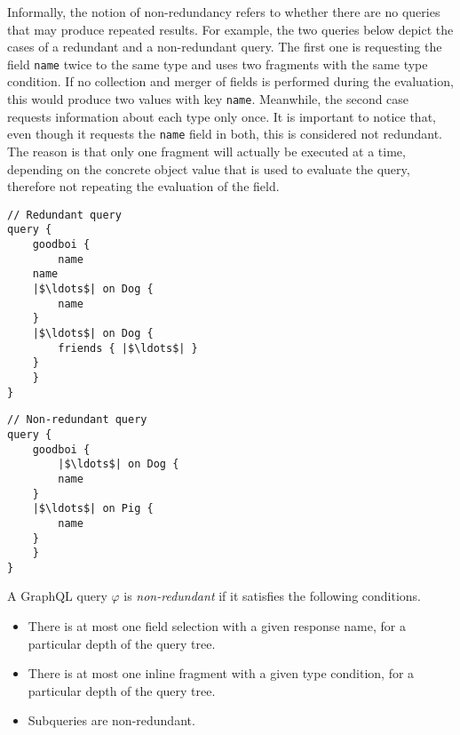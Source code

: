 Informally, the notion of non-redundancy refers to whether there are no queries that may produce repeated results. For example, the two queries below depict the cases of a redundant and a non-redundant query. The first one is requesting the field \texttt{name} twice to the same type and uses two fragments with the same type condition. If no collection and merger of fields is performed during the evaluation, this would produce two values with key \texttt{name}. Meanwhile, the second case requests information about each type only once. It is important to notice that, even though it requests the \texttt{name} field in both,  this is considered not redundant. The reason is that only one fragment will actually be executed at a time, depending on the concrete object value that is used to evaluate the query, therefore not repeating the evaluation of the field.
\begin{minipage}[t]{.25\textwidth}
\begin{verbatim}
// Redundant query
query {
    goodboi {
        name
	name
	|$\ldots$| on Dog {
	    name
	}
	|$\ldots$| on Dog {
	    friends { |$\ldots$| }
	}
    }
}
\end{verbatim}
\end{minipage}%
\begin{minipage}[t]{.25\textwidth}
\begin{verbatim}
// Non-redundant query
query {
    goodboi {
        |$\ldots$| on Dog {
	    name
	}
	|$\ldots$| on Pig {
	    name
	}
    }	
}
\end{verbatim} 
\end{minipage}

\begin{definition}
A GraphQL query $\varphi$ is \textit{non-redundant} if it satisfies the following conditions.
\begin{itemize}
    \item There is at most one field selection with a given response name, for a particular depth of the query tree.

    \item There is at most one inline fragment with a given type condition, for a particular depth of the query tree.
    
    \item Subqueries are non-redundant.
\end{itemize}
\end{definition}

